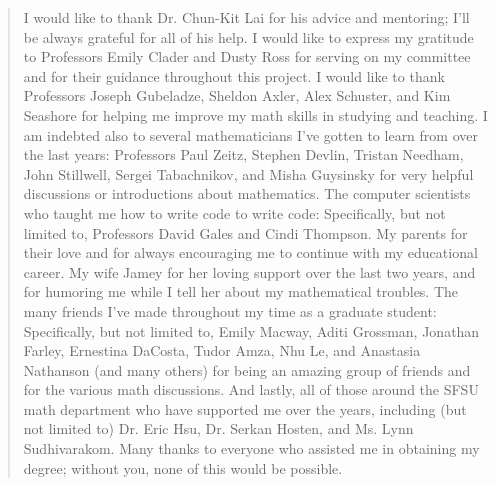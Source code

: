 \documentclass[12pt,oneside]{sfsuthesis}
\theoremstyle{plain} %
\theoremstyle{definition}  %
\theoremstyle{remark}  %
\theoremstyle{plain}
\begin{document}
{\vspace{.3in}
\begin{quote}
\noindent
I would like to thank Dr. Chun-Kit Lai for his advice and mentoring; I'll be always grateful for all of his help. 
I would like to express my gratitude to Professors Emily Clader and Dusty Ross for serving on my committee and for their guidance throughout this project.
I would like to thank Professors Joseph Gubeladze, Sheldon Axler, Alex Schuster, and Kim Seashore for helping me improve my math skills in studying and teaching. 
I am indebted also to several mathematicians I’ve gotten to learn from over the last years: Professors Paul Zeitz, Stephen Devlin, Tristan Needham, John Stillwell, Sergei Tabachnikov, and Misha Guysinsky for very helpful discussions or introductions about mathematics. The computer scientists who taught me how to write code to write code: Specifically, but not limited to, Professors David Gales and Cindi Thompson.
My parents for their love and for always encouraging me to continue with my educational career. 
My wife Jamey for her loving support over the last two years, and for humoring me while I tell her about my mathematical troubles.
The many friends I’ve made throughout my time as a graduate student: Specifically, but not limited to, Emily Macway, Aditi Grossman, Jonathan Farley, Ernestina DaCosta, Tudor Amza, Nhu Le, and Anastasia Nathanson (and many others) for being an amazing group of friends and for the various math discussions. 
And lastly, all of those around the SFSU math department who have supported me over the years, including (but not limited to) Dr. Eric Hsu, Dr. Serkan Hosten, and Ms. Lynn Sudhivarakom. 
Many thanks to everyone who assisted me in obtaining my degree; without you, none of this would be possible.
\end{quote}

\renewcommand{\contentsname}{\vspace{-1.8in} \begin{center} \normalsize \rm TABLE OF CONTENTS \end{center}}
\renewcommand{\listfigurename}{\vspace{-1.8in} \begin{center} \normalsize \rm LIST OF FIGURES \end{center}}
\renewcommand{\listtablename}{\vspace{-1.8in} \begin{center} \normalsize \rm LIST OF TABLES \end{center}}
\renewcommand{\cftchapfont}{\normalfont}
\renewcommand{\cftchappagefont}{\normalfont}
\renewcommand{\cftchapleader}{\cftdotfill{\cftdotsep}} %
\renewcommand{\cftsecfont}{\normalfont}
\renewcommand{\cftsecpagefont}{\normalfont}
\renewcommand{\cftsecleader}{\cftdotfill{\cftdotsep}}

}
\end{document}
